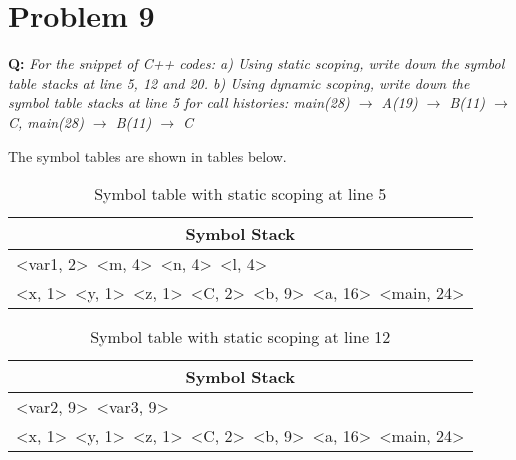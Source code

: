 \documentclass{article}
\begin{document}
\section*{Problem 9}
\textbf{Q:} \textit{For the snippet of C++ codes: a) Using static scoping, write down the symbol table stacks at line 5, 12 and 20. b) Using dynamic scoping, write down the symbol table stacks at line 5 for call histories: main(28) $\rightarrow$ A(19) $\rightarrow$ B(11) $\rightarrow$ C, main(28) $\rightarrow$ B(11) $\rightarrow$ C}

The symbol tables are shown in tables below.

\begin{table}[hp]
\begin{center}
\begin{tabular}{l}
\toprule
\multicolumn{1}{c}{Symbol Stack}\\
\midrule
\textless var1, 2\textgreater\ \textless m, 4\textgreater\ \textless n, 4\textgreater\ \textless l, 4\textgreater \\
\textless x, 1\textgreater\ \textless y, 1\textgreater\ \textless z, 1\textgreater\ \textless C, 2\textgreater\ \textless b, 9\textgreater\ \textless a, 16\textgreater\ \textless main, 24\textgreater\\
\bottomrule
\end{tabular}
\caption{Symbol table with static scoping at line 5}
\end{center}
\end{table}

\begin{table}[hp]
\begin{center}
\begin{tabular}{l}
\toprule
\multicolumn{1}{c}{Symbol Stack}\\
\midrule
\textless var2, 9\textgreater\ \textless var3, 9\textgreater \\
\textless x, 1\textgreater\ \textless y, 1\textgreater\ \textless z, 1\textgreater\ \textless C, 2\textgreater\ \textless b, 9\textgreater\ \textless a, 16\textgreater\ \textless main, 24\textgreater\\
\bottomrule
\end{tabular}
\caption{Symbol table with static scoping at line 12}
\end{center}
\end{table}
\end{document}
